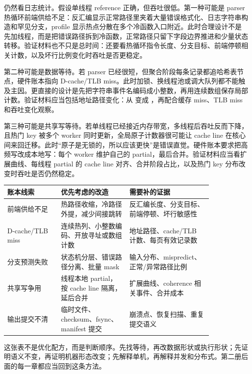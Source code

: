 仍然看日志统计。假设单线程 reference 正确，但吞吐很低。第一种可能是 parser 热循环前端供给不足：反汇编显示正常路径里夹着大量错误格式化、日志字符串构造和罕见分支，profile 显示热点分散在多个冷函数入口附近。此时合理设计不是先加线程，而是把错误路径拆到冷函数，正常路径只留下字段边界推进和少量状态转移。验证材料也不只是总时间：还要看热循环指令长度、分支目标、前端停顿相关计数，以及坏行比例变化时吞吐是否更稳定。

第二种可能是数据等待。若 parser 已经很短，但聚合阶段每条记录都追哈希表节点，硬件账本指向 D-cache/TLB miss。此时加锁、换线程池或调大队列都不能触及主因。更直接的设计是先把字符串事件名编码成小整数，再用连续数组保存局部计数。验证材料应当包括地址路径变化：从  变成 ，再配合缓存 miss、TLB miss 和吞吐变化观察。

第三种可能是共享写等待。若单线程已经接近内存带宽，多线程后吞吐反而下降，且热门 key 被多个 worker 同时更新，全局原子计数器很可能让 cache line 在核心间来回迁移。此时“原子是无锁的，所以应该更快”是错误直觉。硬件账本要求把高频写改成本地写：每个 worker 维护自己的 partial，最后合并。验证材料应当看扩展曲线、每线程 partial 的 cache line 对齐、合并阶段占比，以及热门 key 分布改变时吞吐是否仍然稳定。

\begin{center}
\begin{tabular}{p{0.22\linewidth}p{0.28\linewidth}p{0.34\linewidth}}
\toprule
账本线索 & 优先考虑的改造 & 需要补的证据 \\
\midrule
前端供给不足 & 热路径收缩，冷路径外提，减少间接跳转 & 反汇编长度、分支目标、前端停顿、坏行敏感性 \\
D-cache/TLB miss & 连续热列、小整数编码、开放寻址或数组计数 & 地址路径、cache/TLB 计数、每页有效记录数 \\
分支预测失败 & 状态机分层、错误路径分离、批量 mask & 输入分布、mispredict、正常/异常路径比例 \\
共享写争用 & 线程本地 partial，按 cache line 隔离，延后合并 & 扩展曲线、coherence 相关事件、合并成本 \\
输出提交不清 & 临时文件、checksum、fsync、manifest 提交 & 崩溃点、恢复扫描、重复提交语义 \\
\bottomrule
\end{tabular}
\end{center}

这张表不是优化配方，而是判断顺序。先找等待，再改数据形状或执行形状；先证明语义不变，再证明机器形态改变；先解释单机，再解释并发和分布式。第二册后面的每一章都应当回到这条方法。

